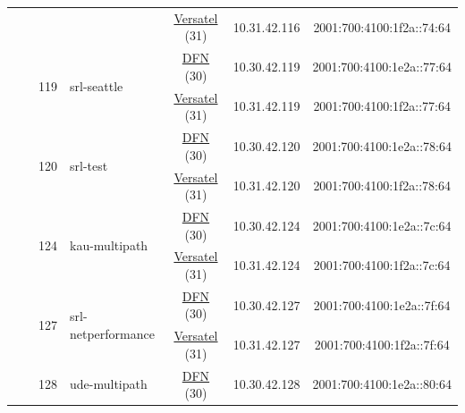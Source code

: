 \begin{small}
\begin{center}
\begin{longtable}{|c|c|c|c|c|c|c|c|}
  &  &  &  & \multicolumn{2}{|c|}{\tiny{\href{http://www.versatel.de}{Versatel} (31)}} & \tiny{10.31.42.116} & \tiny{2001:700:4100:1f2a::74:64} \\* \cline{3-3}\cline{4-4}\cline{5-5}\cline{6-6}\cline{7-7}\cline{8-8}
  &  & \multirow{2}{*}{\tiny{119}} & \multicolumn{1}{|l|}{\multirow{2}{*}{\tiny{srl-seattle}}} & \multicolumn{2}{|c|}{\tiny{\href{https://www.dfn.de}{DFN} (30)}} & \tiny{10.30.42.119} & \tiny{2001:700:4100:1e2a::77:64} \\* \cline{5-5}\cline{6-6}\cline{7-7}\cline{8-8}
  &  &  &  & \multicolumn{2}{|c|}{\tiny{\href{http://www.versatel.de}{Versatel} (31)}} & \tiny{10.31.42.119} & \tiny{2001:700:4100:1f2a::77:64} \\* \cline{3-3}\cline{4-4}\cline{5-5}\cline{6-6}\cline{7-7}\cline{8-8}
  &  & \multirow{2}{*}{\tiny{120}} & \multicolumn{1}{|l|}{\multirow{2}{*}{\tiny{srl-test}}} & \multicolumn{2}{|c|}{\tiny{\href{https://www.dfn.de}{DFN} (30)}} & \tiny{10.30.42.120} & \tiny{2001:700:4100:1e2a::78:64} \\* \cline{5-5}\cline{6-6}\cline{7-7}\cline{8-8}
  &  &  &  & \multicolumn{2}{|c|}{\tiny{\href{http://www.versatel.de}{Versatel} (31)}} & \tiny{10.31.42.120} & \tiny{2001:700:4100:1f2a::78:64} \\* \cline{3-3}\cline{4-4}\cline{5-5}\cline{6-6}\cline{7-7}\cline{8-8}
  &  & \multirow{2}{*}{\tiny{124}} & \multicolumn{1}{|l|}{\multirow{2}{*}{\tiny{kau-multipath}}} & \multicolumn{2}{|c|}{\tiny{\href{https://www.dfn.de}{DFN} (30)}} & \tiny{10.30.42.124} & \tiny{2001:700:4100:1e2a::7c:64} \\* \cline{5-5}\cline{6-6}\cline{7-7}\cline{8-8}
  &  &  &  & \multicolumn{2}{|c|}{\tiny{\href{http://www.versatel.de}{Versatel} (31)}} & \tiny{10.31.42.124} & \tiny{2001:700:4100:1f2a::7c:64} \\* \cline{3-3}\cline{4-4}\cline{5-5}\cline{6-6}\cline{7-7}\cline{8-8}
  &  & \multirow{2}{*}{\tiny{127}} & \multicolumn{1}{|l|}{\multirow{2}{*}{\tiny{srl-netperformance}}} & \multicolumn{2}{|c|}{\tiny{\href{https://www.dfn.de}{DFN} (30)}} & \tiny{10.30.42.127} & \tiny{2001:700:4100:1e2a::7f:64} \\* \cline{5-5}\cline{6-6}\cline{7-7}\cline{8-8}
  &  &  &  & \multicolumn{2}{|c|}{\tiny{\href{http://www.versatel.de}{Versatel} (31)}} & \tiny{10.31.42.127} & \tiny{2001:700:4100:1f2a::7f:64} \\* \cline{3-3}\cline{4-4}\cline{5-5}\cline{6-6}\cline{7-7}\cline{8-8}
  &  & \multirow{2}{*}{\tiny{128}} & \multicolumn{1}{|l|}{\multirow{2}{*}{\tiny{ude-multipath}}} & \multicolumn{2}{|c|}{\tiny{\href{https://www.dfn.de}{DFN} (30)}} & \tiny{10.30.42.128} & \tiny{2001:700:4100:1e2a::80:64} \\* \cline{5-5}\cline{6-6}\cline{7-7}\cline{8-8}

\end{longtable}
\end{center}
\end{small}
